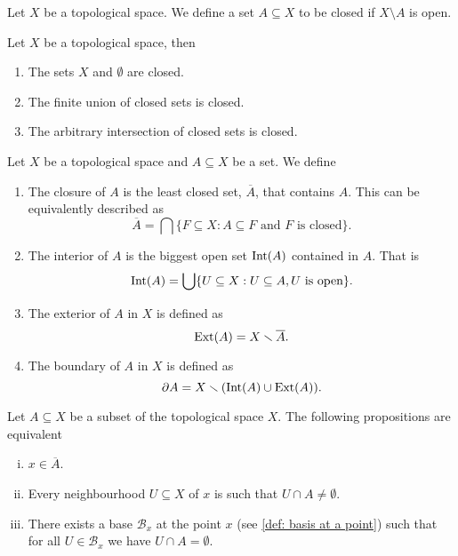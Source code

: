 \begin{definition}
  Let \(X\) be a topological space. We define a set \(A \subseteq X\) to be
  closed if \(X \setminus A\) is open.
\end{definition}

\begin{proposition}
  Let \(X\) be a topological space, then
  \begin{enumerate}
    \item The sets \(X\) and \(\emptyset\) are closed.
    \item The finite union of closed sets is closed.
    \item The arbitrary intersection of closed sets is closed.
  \end{enumerate}
\end{proposition}

\begin{definition}[Miscelaneous]
  Let \(X\) be a topological space and \(A \subseteq X\) be a set. We define
  \begin{enumerate}
    \item\label{def: closure}
      The closure of \(A\) is the least closed set, \(\overline A\), that
      contains \(A\). This can be equivalently described as
      \[
        \overline A = \bigcap \{F \subseteq X : A \subseteq F \text{ and } F
        \text{ is closed}\}.
      \] 
    \item\label{def: interior}
      The interior of \(A\) is the biggest open set \(\operatorname{Int}(A)\) contained in
      \(A\). That is 
       \[
         \operatorname{Int}(A) = \bigcup \{U \subseteq X : U \subseteq A, U \text{ is open}\}.
      \] 
    \item\label{def: exterior}
      The exterior of \(A\) in \(X\) is defined as
      \[
        \operatorname{Ext}(A) = X \smallsetminus \overline A.
      \] 
    \item\label{def: boundary}
      The boundary of \(A\) in \(X\) is defined as
      \[
        \partial A = X \smallsetminus (\operatorname{Int}(A) \cup \operatorname{Ext}(A)).
      \] 
  \end{enumerate}
\end{definition}

\begin{proposition}\label{prop: closure equivalent prop}
  Let \(A \subseteq X\) be a subset of the topological space \(X\). The
  following propositions are equivalent
  \begin{enumerate}[(i)]
    \item \(x \in \overline A\).
    \item Every neighbourhood \(U \subseteq X\) of \(x\) is such that \(U
      \cap A \neq \emptyset\).
    \item There exists a base \(\mathcal B_x\) at the point \(x\) (see
      \cref{def: basis at a point}) such that for all \(U \in \mathcal B_x\) we
      have \(U \cap A = \emptyset\).
  \end{enumerate}
\end{proposition}

